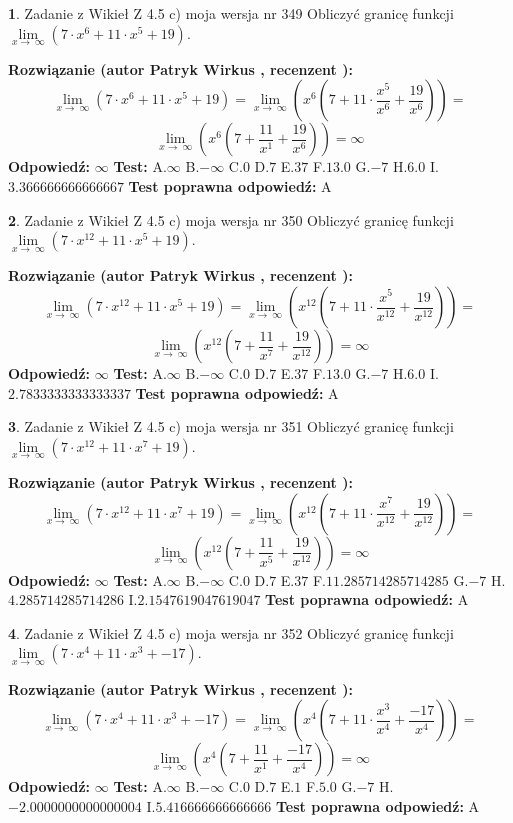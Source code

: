 \documentclass[12pt, a4paper]{article}
\theoremstyle{definition} %
\newtheorem{zad}{}
\newcommand{\zadStart}[1]{\begin{zad}#1\newline}
\newcommand{\zadStop}{\end{zad}}
\newcommand{\rozwStart}[2]{\noindent \textbf{Rozwiązanie (autor #1 , recenzent #2): }\newline}
\newcommand{\rozwStop}{\newline}
\newcommand{\odpStart}{\noindent \textbf{Odpowiedź:}\newline}
\newcommand{\odpStop}{\newline}
\newcommand{\testStart}{\noindent \textbf{Test:}\newline}
\newcommand{\testStop}{\newline}
\newcommand{\kluczStart}{\noindent \textbf{Test poprawna odpowiedź:}\newline}
\newcommand{\kluczStop}{\newline}
\begin{document}
\zadStart{Zadanie z Wikieł Z 4.5 c) moja wersja nr 349}
Obliczyć granicę funkcji  $\lim\limits_{x\to\ \infty}(7 \cdot x^{6}+11 \cdot x^{5}+19)$.
\zadStop
\rozwStart{Patryk Wirkus}{}
$$\lim\limits_{x\to\ \infty}(7 \cdot x^{6}+11 \cdot x^{5}+19) = \lim\limits_{x\to\ \infty}(x^{6}(7 +11 \cdot \frac{x^{5}}{x^{6}}+\frac{19}{x^{6}})) =$$ $$\lim\limits_{x\to\ \infty}(x^{6}(7 +\frac{11}{x^{1}}+\frac{19}{x^{6}})) =\infty$$
\rozwStop
\odpStart
$\infty$
\odpStop
\testStart
A.$\infty$ B.$-\infty$ C.$0$ D.$7$ E.$37$
F.$13.0$ G.$-7$
H.$6.0$
I.$3.366666666666667$
\testStop
\kluczStart
A
\kluczStop



\zadStart{Zadanie z Wikieł Z 4.5 c) moja wersja nr 350}
Obliczyć granicę funkcji  $\lim\limits_{x\to\ \infty}(7 \cdot x^{12}+11 \cdot x^{5}+19)$.
\zadStop
\rozwStart{Patryk Wirkus}{}
$$\lim\limits_{x\to\ \infty}(7 \cdot x^{12}+11 \cdot x^{5}+19) = \lim\limits_{x\to\ \infty}(x^{12}(7 +11 \cdot \frac{x^{5}}{x^{12}}+\frac{19}{x^{12}})) =$$ $$\lim\limits_{x\to\ \infty}(x^{12}(7 +\frac{11}{x^{7}}+\frac{19}{x^{12}})) =\infty$$
\rozwStop
\odpStart
$\infty$
\odpStop
\testStart
A.$\infty$ B.$-\infty$ C.$0$ D.$7$ E.$37$
F.$13.0$ G.$-7$
H.$6.0$
I.$2.7833333333333337$
\testStop
\kluczStart
A
\kluczStop



\zadStart{Zadanie z Wikieł Z 4.5 c) moja wersja nr 351}
Obliczyć granicę funkcji  $\lim\limits_{x\to\ \infty}(7 \cdot x^{12}+11 \cdot x^{7}+19)$.
\zadStop
\rozwStart{Patryk Wirkus}{}
$$\lim\limits_{x\to\ \infty}(7 \cdot x^{12}+11 \cdot x^{7}+19) = \lim\limits_{x\to\ \infty}(x^{12}(7 +11 \cdot \frac{x^{7}}{x^{12}}+\frac{19}{x^{12}})) =$$ $$\lim\limits_{x\to\ \infty}(x^{12}(7 +\frac{11}{x^{5}}+\frac{19}{x^{12}})) =\infty$$
\rozwStop
\odpStart
$\infty$
\odpStop
\testStart
A.$\infty$ B.$-\infty$ C.$0$ D.$7$ E.$37$
F.$11.285714285714285$ G.$-7$
H.$4.285714285714286$
I.$2.1547619047619047$
\testStop
\kluczStart
A
\kluczStop



\zadStart{Zadanie z Wikieł Z 4.5 c) moja wersja nr 352}
Obliczyć granicę funkcji  $\lim\limits_{x\to\ \infty}(7 \cdot x^{4}+11 \cdot x^{3}+-17)$.
\zadStop
\rozwStart{Patryk Wirkus}{}
$$\lim\limits_{x\to\ \infty}(7 \cdot x^{4}+11 \cdot x^{3}+-17) = \lim\limits_{x\to\ \infty}(x^{4}(7 +11 \cdot \frac{x^{3}}{x^{4}}+\frac{-17}{x^{4}})) =$$ $$\lim\limits_{x\to\ \infty}(x^{4}(7 +\frac{11}{x^{1}}+\frac{-17}{x^{4}})) =\infty$$
\rozwStop
\odpStart
$\infty$
\odpStop
\testStart
A.$\infty$ B.$-\infty$ C.$0$ D.$7$ E.$1$
F.$5.0$ G.$-7$
H.$-2.0000000000000004$
I.$5.416666666666666$
\testStop
\kluczStart
A
\kluczStop
\end{document}
